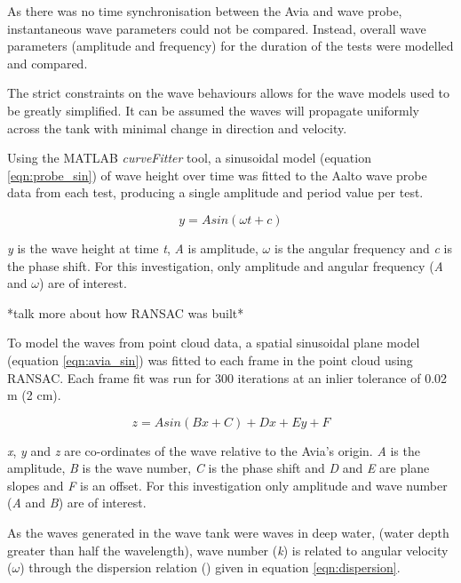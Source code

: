 As there was no time synchronisation between the Avia and wave probe, instantaneous wave parameters could not be compared. Instead, overall wave parameters (amplitude and frequency) for the duration of the tests were modelled and compared. 

The strict constraints on the wave behaviours allows for the wave models used to be greatly simplified. It can be assumed the waves will propagate uniformly across the tank with minimal change in direction and velocity.

Using the MATLAB \emph{curveFitter} tool, a sinusoidal model (equation \ref{eqn:probe_sin}) of wave height over time was fitted to the Aalto wave probe data from each test, producing a single amplitude and period value per test.

\begin{equation} \label{eqn:probe_sin}
    y = Asin(\omega t + c)
\end{equation}

\textit{y} is the wave height at time \textit{t}, \textit{A} is  amplitude, \textit{$\omega$} is the  angular frequency and \textit{c} is the phase shift. For this investigation, only amplitude and angular frequency (\textit{A} and \textit{$\omega$}) are of interest.

*talk more about how RANSAC was built*

To model the waves from point cloud data, a spatial sinusoidal plane model (equation \ref{eqn:avia_sin}) was fitted to each frame in the point cloud using \ac{RANSAC}. Each frame fit was run for 300 iterations at an inlier tolerance of 0.02 m (2 cm).

\begin{equation} \label{eqn:avia_sin}
    z = Asin(Bx + C) + Dx + Ey + F
\end{equation}

\textit{x}, \textit{y} and \textit{z} are co-ordinates of the wave relative to the Avia's origin. \textit{A} is the amplitude, \textit{B} is the wave number, \textit{C} is the phase shift and \textit{D} and \textit{E} are plane slopes and \textit{F} is an offset. For this investigation only amplitude and wave number (\textit{A} and \textit{B}) are of interest.

As the waves generated in the wave tank were waves in deep water, (water depth greater than half the wavelength), wave number (\textit{k}) is related to angular velocity (\textit{$\omega$}) through the dispersion relation (\cite{dingemansWaterWavePropagation1997}) given in equation \ref{eqn:dispersion}.

